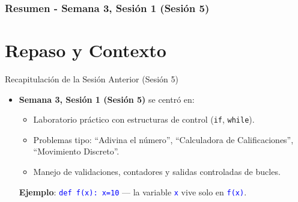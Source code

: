\documentclass[10pt]{beamer}
\begin{document}
\myfront{}

\begin{frame}
  \titlepage
\end{frame}

\begin{frame}
  \frametitle{Resumen - Semana 3, Sesión 1 (Sesión 5)}
  \tableofcontents
\end{frame}


\section{Repaso y Contexto}

\begin{frame}{Recapitulación de la Sesión Anterior (Sesión 5)}
  \begin{itemize}
    \item \textbf{Semana 3, Sesión 1 (Sesión 5)} se centró en:
      \begin{itemize}
        \item Laboratorio práctico con estructuras de control (\texttt{if}, \texttt{while}).
        \item Problemas tipo: “Adivina el número”, “Calculadora de Calificaciones”, “Movimiento Discreto”.
        \item Manejo de validaciones, contadores y salidas controladas de bucles.
      \end{itemize}
      \textbf{Ejemplo}: {\texttt{\textcolor{blue}{def f(x): x=10}}} — la variable {\texttt{\textcolor{blue}{x}}} vive solo en {\texttt{\textcolor{blue}{f(x)}}}.
  \end{itemize}
\end{frame}
\end{document}
